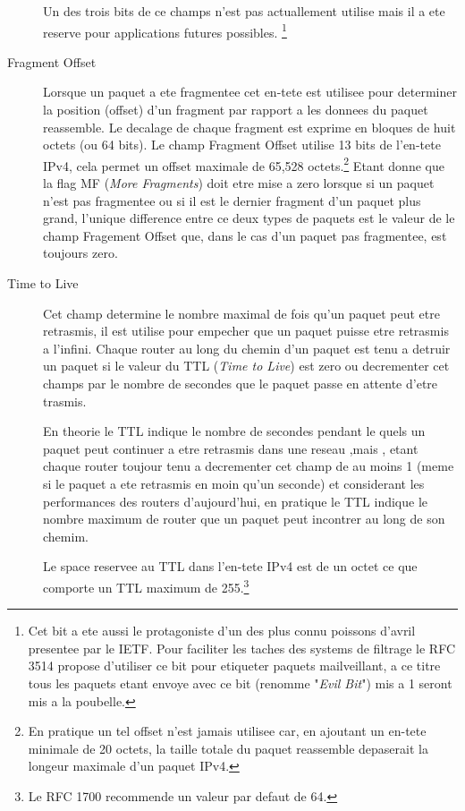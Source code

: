 \documentclass[twoside,openright,a4paper,11pt,french]{article}
\begin{document}
\begin{description}
Un des trois bits de ce champs n'est pas actuallement utilise mais il a ete
reserve pour applications futures possibles.
\footnote {Cet bit a ete aussi le protagoniste d'un des plus connu poissons
d'avril presentee par le IETF. Pour faciliter les taches des systems de filtrage 
le RFC 3514 propose d'utiliser ce bit pour etiqueter paquets mailveillant, a ce
titre tous les paquets etant envoye avec ce bit (renomme "{\it Evil Bit}") 
mis a 1 seront mis a la poubelle.
}

\item [Fragment Offset]
Lorsque un paquet a ete fragmentee cet en-tete est utilisee pour determiner la 
position (offset) d'un fragment par rapport a les donnees du paquet reassemble.
Le decalage de chaque fragment est exprime en bloques de huit octets (ou 64
bits).  Le champ Fragment Offset utilise 13 bits de l'en-tete IPv4, cela permet
un offset maximale de 65,528 octets.\footnote {En pratique un tel offset n'est
jamais utilisee car, en ajoutant un en-tete minimale de 20 octets, la taille 
totale du paquet reassemble depaserait la longeur maximale d'un paquet IPv4.}
Etant donne que la flag MF ({\it More Fragments}) doit etre mise a zero lorsque 
si un paquet n'est pas fragmentee ou si il est le dernier fragment d'un paquet
plus grand, l'unique difference entre ce deux types de paquets est le valeur
de le champ Fragement Offset que, dans le cas d'un paquet pas fragmentee, est
toujours zero.

\item [Time to Live]
Cet champ determine le nombre maximal de fois qu'un paquet peut etre retrasmis, 
il est utilise pour empecher que un paquet puisse etre retrasmis a l'infini.
Chaque router au long du chemin d'un paquet est tenu a detruir un paquet si le
valeur du TTL ({\it Time to Live}) est zero ou decrementer cet champs par le
nombre de secondes que le paquet passe en attente d'etre trasmis.

En theorie le TTL indique le nombre de secondes pendant le quels un paquet
peut continuer a etre retrasmis dans une reseau ,mais , etant chaque router
toujour tenu a decrementer cet champ de au moins 1 (meme si le paquet a ete
retrasmis en moin qu'un seconde) et considerant les performances des routers
d'aujourd'hui, en pratique le TTL indique le nombre maximum de router que
un paquet peut incontrer au long de son chemim.

Le space reservee au TTL dans l'en-tete IPv4 est de un octet ce que comporte un 
TTL maximum de 255.\footnote {Le RFC 1700 recommende un valeur par defaut de 64.}


\end{description}
\end{document}

